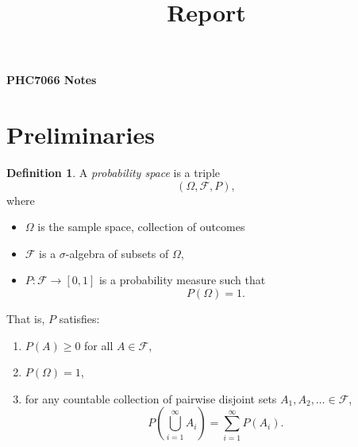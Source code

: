 \documentclass[11pt]{article}
\theoremstyle{definition}
\newtheorem{defn}{Definition}[section]
\begin{document}
\title{Report}

\thispagestyle{empty}

\begin{center}
{\LARGE \bf PHC7066 Notes}\\
\end{center}
\tableofcontents
\newpage
\section{Preliminaries}
\begin{defn}
    A \emph{probability space} is a triple
\[
(\Omega,\mathcal{F},P),
\]
where
\begin{itemize}
    \item \(\Omega\) is the sample space, collection of outcomes
    \item \(\mathcal{F}\) is a \(\sigma\)-algebra of subsets of \(\Omega\),
    \item \(P:\mathcal{F}\to[0,1]\) is a probability measure such that
    \[
    P(\Omega)=1.
    \]
\end{itemize}

That is, \(P\) satisfies:
\begin{enumerate}
    \item \(P(A)\ge 0\) for all \(A\in\mathcal{F}\),
    \item \(P(\Omega)=1\),
    \item for any countable collection of pairwise disjoint sets \(A_1,A_2,\dots\in\mathcal{F}\),
    \[
    P\!\left(\bigcup_{i=1}^{\infty} A_i\right)
    =
    \sum_{i=1}^{\infty} P(A_i).
    \]
\end{enumerate}
\end{defn}
\end{document}
